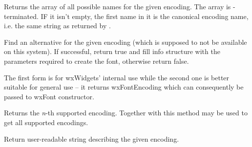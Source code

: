 


\label{wxfontmappergetallencodingnames}


Returns the array of all possible names for the given encoding. The array is
\NULL-terminated. IF it isn't empty, the first name in it is the canonical
encoding name, i.e. the same string as returned by 
.


\label{wxfontmappergetaltforencoding}



Find an alternative for the given encoding (which is supposed to not be
available on this system). If successful, return true and fill info
structure with the parameters required to create the font, otherwise
return false.

The first form is for wxWidgets' internal use while the second one
is better suitable for general use -- it returns wxFontEncoding which
can consequently be passed to wxFont constructor.


\label{wxfontmappergetencoding}


Returns the {\it n}-th supported encoding. Together with 
this method may be used to get all supported encodings.


\label{wxfontmappergetencodingdescription}


Return user-readable string describing the given encoding.


